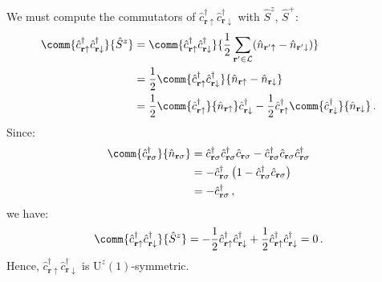 \begin{tabproof}

	We must compute the commutators of $\hat c_{\mathbf{r}\uparrow}^\dagger \hat c_{\mathbf{r}\downarrow}^\dagger$ with $\hat S^z$, $\hat S^+$:
	\[
	\begin{aligned}
		\comm{\hat c_{\mathbf{r}\uparrow}^\dagger \hat c_{\mathbf{r}\downarrow}^\dagger}{\hat S^z} &= \comm{\hat c_{\mathbf{r}\uparrow}^\dagger \hat c_{\mathbf{r}\downarrow}^\dagger}{\frac{1}{2} \sum_{\mathbf{r}'\in\mathcal{L}} (\hat n_{\mathbf{r}'\uparrow}-\hat n_{\mathbf{r}'\downarrow})} \\
		&= \frac{1}{2} \comm{\hat c_{\mathbf{r}\uparrow}^\dagger \hat c_{\mathbf{r}\downarrow}^\dagger}{\hat n_{\mathbf{r}\uparrow}-\hat n_{\mathbf{r}\downarrow}} \\
		&= \frac{1}{2} \comm{\hat c_{\mathbf{r}\uparrow}^\dagger}{\hat n_{\mathbf{r}\uparrow}} \hat c_{\mathbf{r}\downarrow}^\dagger - \frac{1}{2} \hat c_{\mathbf{r}\uparrow}^\dagger \comm{\hat c_{\mathbf{r}\downarrow}^\dagger}{\hat n_{\mathbf{r}\downarrow}} \, .
	\end{aligned}
	\]
	Since:
	\begin{align}
		\comm{\hat c_{\mathbf{r}\sigma}^\dagger}{\hat n_{\mathbf{r}\sigma}} &= \hat c_{\mathbf{r}\sigma}^\dagger \hat c_{\mathbf{r}\sigma}^\dagger \hat c_{\mathbf{r}\sigma} - \hat c_{\mathbf{r}\sigma}^\dagger \hat c_{\mathbf{r}\sigma} \hat c_{\mathbf{r}\sigma}^\dagger \nonumber \\
		&= -\hat c_{\mathbf{r}\sigma}^\dagger \left(
		1 - \hat c_{\mathbf{r}\sigma}^\dagger \hat c_{\mathbf{r}\sigma} \right) \nonumber \\
		&= -\hat c_{\mathbf{r}\sigma}^\dagger \label{eq:[c+,n]} \, ,
	\end{align}
	we have:
	\[
		\comm{\hat c_{\mathbf{r}\uparrow}^\dagger \hat c_{\mathbf{r}\downarrow}^\dagger}{\hat S^z} = -\frac{1}{2} \hat c_{\mathbf{r}\uparrow}^\dagger \hat c_{\mathbf{r}\downarrow}^\dagger + \frac{1}{2} \hat c_{\mathbf{r}\uparrow}^\dagger \hat c_{\mathbf{r}\downarrow}^\dagger = 0 \, .
	\]
	Hence, $\hat c_{\mathbf{r}\uparrow}^\dagger \hat c_{\mathbf{r}\downarrow}^\dagger$ is $\mathrm{U}^z(1)$-symmetric.
	

\end{tabproof}

